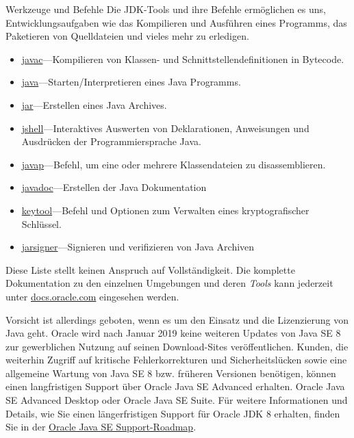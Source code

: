\begin{frame}{Werkzeuge und Befehle}
	Die JDK-Tools und ihre Befehle ermöglichen es uns, 
	Entwicklungsaufgaben wie das Kompilieren und Ausführen eines Programms, 
	das Paketieren von Quelldateien und vieles mehr zu erledigen.
	
	\begin{itemize}
		\item\href{https://docs.oracle.com/en/java/javase/11/tools/javac.html}
		{javac}---Kompilieren von Klassen- und Schnittstellendefinitionen 
		in Bytecode.
		\item\href{https://docs.oracle.com/en/java/javase/11/tools/java.html}
		{java}---Starten/Interpretieren eines Java Programms.
		\item\href{https://docs.oracle.com/en/java/javase/11/tools/jar.html}
		{jar}---Erstellen eines Java Archives.
		\item\href{https://docs.oracle.com/en/java/javase/11/tools/jshell.html}
		{jshell}---Interaktives Auswerten von Deklarationen, Anweisungen und 
		Ausdrücken der Programmiersprache Java. 
		\item<article>\href{https://docs.oracle.com/en/java/javase/11/tools/javap.html}
		{javap}---Befehl, um eine oder mehrere Klassendateien zu 
		disassemblieren.
		\item<article>\href{https://docs.oracle.com/en/java/javase/11/tools/javadoc.html}
		{javadoc}---Erstellen der Java Dokumentation
		\item<article>\href{https://docs.oracle.com/en/java/javase/11/tools/keytool.html}
		{keytool}---Befehl und Optionen zum Verwalten eines kryptografischer Schlüssel.
		\item<article>\href{https://docs.oracle.com/en/java/javase/11/tools/jarsigner.html}
		{jarsigner}---Signieren und verifizieren von Java Archiven
	\end{itemize}
\end{frame}

Diese Liste stellt keinen Anspruch auf Vollständigkeit. Die komplette Dokumentation
zu den einzelnen Umgebungen und deren {\em Tools} kann jederzeit unter
\href{https://docs.oracle.com/en/java/}{docs.oracle.com} eingesehen werden.

Vorsicht ist allerdings geboten, wenn es um den Einsatz und die Lizenzierung von Java geht.
Oracle wird nach Januar 2019 keine weiteren Updates von Java SE 8 zur 
gewerblichen Nutzung auf seinen Download-Sites veröffentlichen. Kunden, die 
weiterhin Zugriff auf kritische Fehlerkorrekturen und Sicherheitslücken sowie 
eine allgemeine Wartung von Java SE 8 bzw. früheren Versionen benötigen, 
können einen langfristigen Support über Oracle Java SE Advanced erhalten. 
Oracle Java SE Advanced Desktop oder Oracle Java SE Suite. Für weitere 
Informationen und Details, wie Sie einen längerfristigen Support für Oracle 
JDK 8 erhalten, finden Sie in der 
\href{http://www.oracle.com/technetwork/java/eol-135779.html}
{Oracle Java SE Support-Roadmap}.

